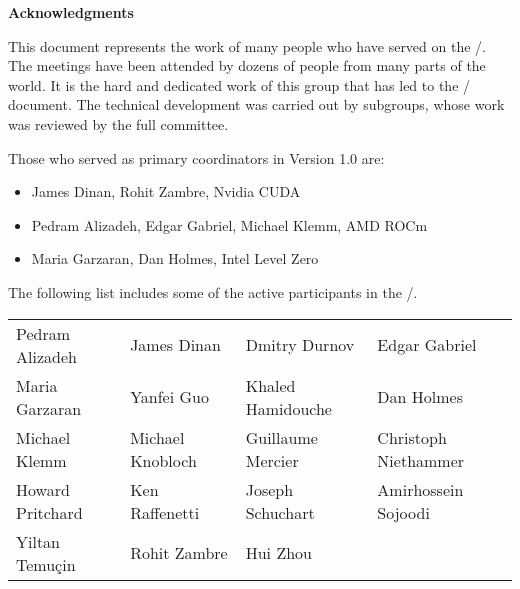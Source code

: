 {\Huge\noindent\textbf{Acknowledgments}}%
{}

\vspace{0.5in}



This document represents the work of many people who have served on
the \MPIHACC/.  The meetings have been attended by dozens of people
from many parts of the world. It is the hard and dedicated work of
this group that has led to the \MEMALLOCDOC/ document. The technical
development was carried out by subgroups, whose work was reviewed by
the full committee.

Those who served as primary coordinators in Version 1.0 are:

\begin{itemize}
\item James Dinan, Rohit Zambre, Nvidia CUDA
\item Pedram Alizadeh, Edgar Gabriel, Michael Klemm, AMD ROCm
\item Maria Garzaran, Dan Holmes, Intel Level Zero
\end{itemize}

The following list includes some of the active participants in
the \MPIHACC/.

\begin{center}
\begin{tabular}{llll}
Pedram Alizadeh &
James Dinan &
Dmitry Durnov &
Edgar Gabriel \\
Maria Garzaran &
Yanfei Guo &
Khaled Hamidouche &
Dan Holmes \\
Michael Klemm &
Michael Knobloch &
Guillaume Mercier &
Christoph Niethammer \\
Howard Pritchard &
Ken Raffenetti &
Joseph Schuchart &
Amirhossein Sojoodi \\
Yiltan Temuçin &
Rohit Zambre &
Hui Zhou
\end{tabular}
\end{center}

